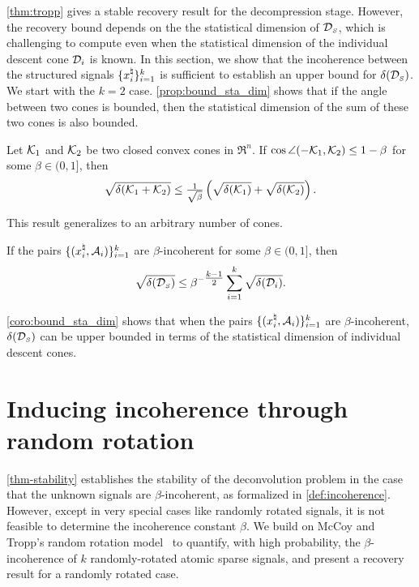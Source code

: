 \autoref{thm:tropp} gives a stable recovery result for the decompression stage. However, the recovery bound depends on the the statistical dimension of $\mathcal{D}_{\scriptscriptstyle S}$, which is challenging to compute even when the statistical dimension of the individual descent cone $\mathcal{D}_i$ is known. In this section, we show that the incoherence between the structured signals $\{x_i^{\natural}\}_{i=1}^k$ is sufficient to establish an upper bound for $\delta(\mathcal{D}_{\scriptscriptstyle S})$. 
We start with the $k = 2$ case. \autoref{prop:bound_sta_dim} shows that if the angle between two cones is bounded, then the statistical dimension of the sum of these two cones is also bounded. 

\begin{proposition}\label{prop:bound_sta_dim}
    Let $\mathcal{K}_1$ and $\mathcal{K}_2$ be two closed convex cones in $\Re^n$. If $\cos\angle(-\mathcal{K}_1, \mathcal{K}_2) \leq 1 - \beta$ for some $\beta \in (0, 1]$, then 
    \[\sqrt{\delta(\mathcal{K}_1 + \mathcal{K}_2)} \leq \tfrac{1}{\sqrt{\beta}}\left(\sqrt{\delta(\mathcal{K}_1)} + \sqrt{\delta(\mathcal{K}_2)} \right).\]
\end{proposition}

This result generalizes to an arbitrary number of cones. 
\begin{corollary}\label{coro:bound_sta_dim}
   If the pairs $\{(x_i^{\natural}, \mathcal{A}_i)\}_{i=1}^k$ are $\beta$-incoherent for some $\beta\in(0,1]$, then
   \[\sqrt{\delta(\mathcal{D}_{\scriptscriptstyle S})} \leq \beta^{-\tfrac{k-1}{2}}\sum_{i=1}^k\sqrt{\delta(\mathcal{D}_i)}.\]
\end{corollary} 
\autoref{coro:bound_sta_dim} shows that when the pairs $\{(x_i^{\natural}, \mathcal{A}_i)\}_{i=1}^k$ are $\beta$-incoherent, $\delta(\mathcal{D}_{\scriptscriptstyle S})$ can be upper bounded in terms of the statistical dimension of individual descent cones.

\section{Inducing incoherence through random rotation}\label{sec-incoherence}

\autoref{thm-stability} establishes the stability of the deconvolution problem in the case that the unknown signals are $\beta$-incoherent, as formalized in \autoref{def:incoherence}. However, except in very special cases like randomly rotated signals, it is not feasible to determine the incoherence constant $\beta$. We build on McCoy and Tropp's random rotation model~\citep{mccoy2013achievable} to quantify, with high probability, the $\beta$-incoherence of $k$ randomly-rotated atomic sparse signals, and present a recovery result for a randomly rotated case.

